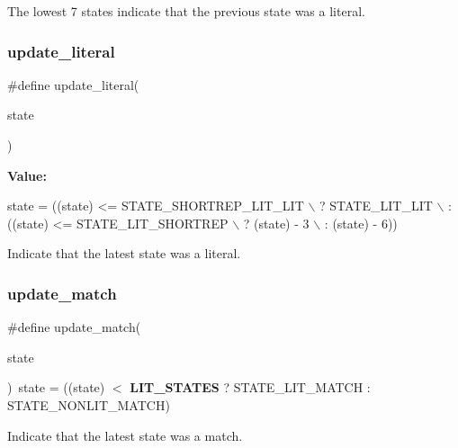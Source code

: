 The lowest 7 states indicate that the previous state was a literal. 

\mbox{\label{lzma__common_8h_a0e9345ff8ee7be54bb081533ee90983d}} 
\subsubsection{update\+\_\+literal}
{\footnotesize\ttfamily \#define update\+\_\+literal(\begin{DoxyParamCaption}\item[{}]{state }\end{DoxyParamCaption})}

{\bfseries Value\+:}
\begin{DoxyCode}
state = ((state) <= STATE\_SHORTREP\_LIT\_LIT \(\backslash\)
                        ? STATE\_LIT\_LIT \(\backslash\)
                        : ((state) <= STATE\_LIT\_SHORTREP \(\backslash\)
                                ? (state) - 3 \(\backslash\)
                                : (state) - 6))
\end{DoxyCode}


Indicate that the latest state was a literal. 

\mbox{\label{lzma__common_8h_a5341ef2436de312cfe09acbe07a0845d}} 
\subsubsection{update\+\_\+match}
{\footnotesize\ttfamily \#define update\+\_\+match(\begin{DoxyParamCaption}\item[{}]{state }\end{DoxyParamCaption})~state = ((state) $<$ \textbf{ L\+I\+T\+\_\+\+S\+T\+A\+T\+ES} ? S\+T\+A\+T\+E\+\_\+\+L\+I\+T\+\_\+\+M\+A\+T\+CH \+: S\+T\+A\+T\+E\+\_\+\+N\+O\+N\+L\+I\+T\+\_\+\+M\+A\+T\+CH)}



Indicate that the latest state was a match. 

\mbox{\label{lzma__common_8h_acf8d33862abfe91c6ff1af15c0dfc3ba}} 

